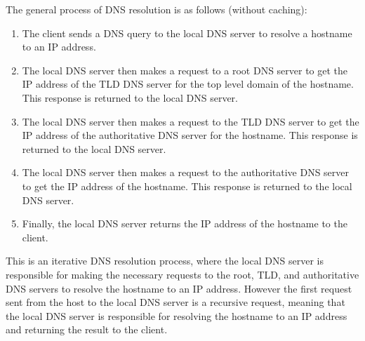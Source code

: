 \documentclass[12pt letter]{report}
\begin{document}


The general process of DNS resolution is as follows (without caching):
\begin{enumerate}
  \item The client sends a DNS query to the local DNS server to resolve a
    hostname to an IP address.
  \item The local DNS server then makes a request to a root DNS
    server to get the IP address of the TLD DNS server for the top
    level domain of the hostname. This response is returned to the
    local DNS server.
  \item The local DNS server then makes a request to the TLD DNS
    server to get the IP address of the authoritative DNS
    server for the hostname. This response is returned to the local DNS server.
  \item The local DNS server then makes a request to the authoritative DNS
    server to get the IP address of the hostname. This response is
    returned to the local DNS server.
  \item Finally, the local DNS server returns the IP address of the
    hostname to the client.
\end{enumerate}
This is an iterative DNS resolution process, where the local DNS
server is responsible for making the necessary requests to the root,
TLD, and authoritative DNS servers to resolve the hostname to an IP address.
However the first request sent from the host to the local DNS server
is a recursive request, meaning that the local DNS server is
responsible for resolving the hostname to an IP address and returning
the result to the client.
\end{document}
